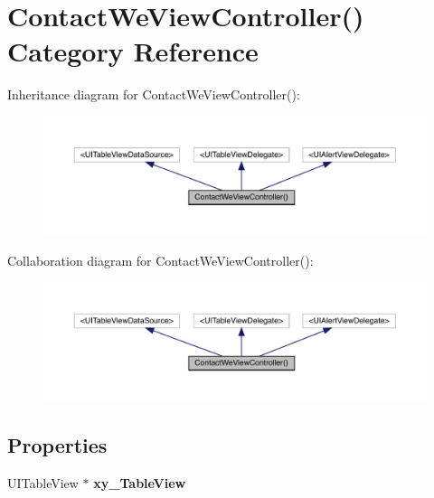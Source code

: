 \hypertarget{category_contact_we_view_controller_07_08}{}\section{Contact\+We\+View\+Controller() Category Reference}
\label{category_contact_we_view_controller_07_08}


Inheritance diagram for Contact\+We\+View\+Controller()\+:\nopagebreak
\begin{figure}[H]
\begin{center}
\leavevmode
\includegraphics[width=350pt]{category_contact_we_view_controller_07_08__inherit__graph}
\end{center}
\end{figure}


Collaboration diagram for Contact\+We\+View\+Controller()\+:\nopagebreak
\begin{figure}[H]
\begin{center}
\leavevmode
\includegraphics[width=350pt]{category_contact_we_view_controller_07_08__coll__graph}
\end{center}
\end{figure}
\subsection*{Properties}
\begin{DoxyCompactItemize}
\item 
\mbox{\label{category_contact_we_view_controller_07_08_a932f6b952db256bd570dbf2b8f283d93}} 
U\+I\+Table\+View $\ast$ {\bfseries xy\+\_\+\+Table\+View}
\end{DoxyCompactItemize}


